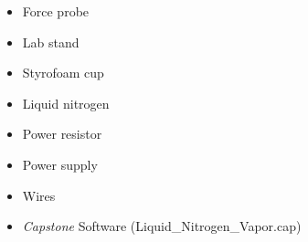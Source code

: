 \begin{itemize}
\item Force probe
\item Lab stand
\item Styrofoam cup
\item Liquid nitrogen
\item Power resistor
\item Power supply
\item Wires
\item \textit{Capstone} Software (Liquid\_Nitrogen\_Vapor.cap)
\end{itemize}
\vspace{0.3cm}
{\centering {} \par}
\vspace{0.3cm}

